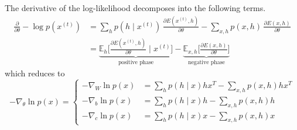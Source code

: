 \documentclass{article}
\begin{document}
    \begin{theorem}
      The derivative of the log-likelihood decomposes into the following terms. 
      \begin{align} 
        \frac{\partial}{\partial \theta} - \log p(x^{(t)}) & = \sum_{h}  p(h \mid x^{(t)}) \, \frac{ \partial E(x^{(t)}, h)}{\partial \theta} - \sum_{x, h} p(x, h) \, \frac{\partial E(x, h)}{\partial \theta} \\
                                                           & = \underbrace{\mathbb{E}_{h} \bigg[ \frac{\partial E( x^{(t)}, h)}{\partial \theta} \; \bigg| \; x^{(t)} \bigg]}_{\text{positive phase}} - \underbrace{\mathbb{E}_{x, h} \bigg[ \frac{\partial E(x, h)}{\partial \theta} \bigg]}_{\text{negative phase}}
      \end{align}
      which reduces to 
      \begin{equation}
        -\nabla_\theta \ln{p(x)} = \begin{cases}
          - \nabla_W \ln{p(x)} & = \sum_h p(h \mid x) h x^T - \sum_{x, h} p(x, h) h x^T \\
          - \nabla_b \ln{p(x)} & =  \sum_h p(h \mid x) h - \sum_{x, h} p(x, h) h \\
          - \nabla_c \ln{p(x)} & =  \sum_h p(h \mid x) x - \sum_{x, h} p(x, h) x
        \end{cases}
      \end{equation}
    \end{theorem}
\end{document}
